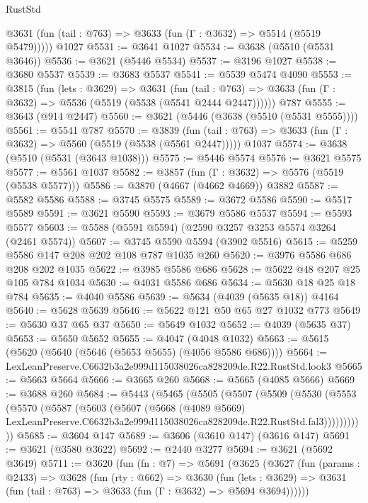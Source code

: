 \begin{lexlean}{RustStd}
\begin{coremodule}
      @3631 (fun (tail : @763) => @3633 (fun (Γ : @3632) => @5514 (@5519 @5479)))))
    @1027
@5531 := @3641 @1027
@5534 := @3638 (@5510 (@5531 @3646))
@5536 := @3621 (@5446 @5534)
@5537 := @3196 @1027
@5538 := @3680 @5537
@5539 := @3683 @5537
@5541 := @5539 @5474 @4090
@5553 := @3815
    (fun (lets : @3629) =>
    @3631
      (fun (tail : @763) => @3633 (fun (Γ : @3632) => @5536 (@5519 (@5538 (@5541 @2444 @2447))))))
    @787
@5555 := @3643 (@914 @2447)
@5560 := @3621 (@5446 (@3638 (@5510 (@5531 @5555))))
@5561 := @5541 @787
@5570 := @3839
    (fun (tail : @763) => @3633 (fun (Γ : @3632) => @5560 (@5519 (@5538 (@5561 @2447)))))
    @1037
@5574 := @3638 (@5510 (@5531 (@3643 @1038)))
@5575 := @5446 @5574
@5576 := @3621 @5575
@5577 := @5561 @1037
@5582 := @3857 (fun (Γ : @3632) => @5576 (@5519 (@5538 @5577)))
@5586 := @3870 (@4667 (@4662 @4669)) @3882
@5587 := @5582 @5586
@5588 := @3745 @5575
@5589 := @3672 @5586
@5590 := @5517 @5589
@5591 := @3621 @5590
@5593 := @3679 @5586 @5537
@5594 := @5593 @5577
@5603 := @5588 (@5591 @5594) (@2590 @3257 @3253 @5574 @3264 (@2461 @5574))
@5607 := @3745 @5590 @5594 (@3902 @5516)
@5615 := @5259 @5586 @147 @208 @202 @108 @787 @1035 @260
@5620 := @3976 @5586 @686 @208 @202 @1035
@5622 := @3985 @5586 @686
@5628 := @5622 @48 @207 @25 @105 @784 @1034
@5630 := @4031 @5586 @686
@5634 := @5630 @18 @25 @18 @784
@5635 := @4040 @5586
@5639 := @5634 (@4039 (@5635 @18)) @4164
@5640 := @5628 @5639
@5646 := @5622 @121 @50 @65 @27 @1032 @773
@5649 := @5630 @37 @65 @37
@5650 := @5649 @1032
@5652 := @4039 (@5635 @37)
@5653 := @5650 @5652
@5655 := @4047 (@4048 @1032)
@5663 := @5615 (@5620 (@5640 (@5646 (@5653 @5655) (@4056 @5586 @686))))
@5664 := LexLeanPreserve.C6632b3a2e999d115038026ca828209de.R22.RustStd.look3
@5665 := @5663 @5664
@5666 := @3665 @260
@5668 := @5665 (@4085 @5666)
@5669 := @3688 @260
@5684 := @5443
    (@5465
      (@5505
        (@5507
          (@5509
            (@5530
              (@5553
                (@5570
                  (@5587
                    (@5603
                      (@5607
                        (@5668
                          (@4089 @5669)
                          LexLeanPreserve.C6632b3a2e999d115038026ca828209de.R22.RustStd.fal3)))))))))))
@5685 := @3604 @147
@5689 := @3606 (@3610 @147) (@3616 @147)
@5691 := @3621 (@3580 @3622)
@5692 := @2440 @3277
@5694 := @3621 (@5692 @3649)
@5711 := @3620
    (fun (fn : @7) =>
    @5691
      (@3625
        (@3627
          (fun (params : @2433) =>
          @3628
            (fun (rty : @662) =>
            @3630
              (fun (lets : @3629) =>
              @3631 (fun (tail : @763) => @3633 (fun (Γ : @3632) => @5694 @3694))))))

\end{coremodule}
\end{lexlean}
